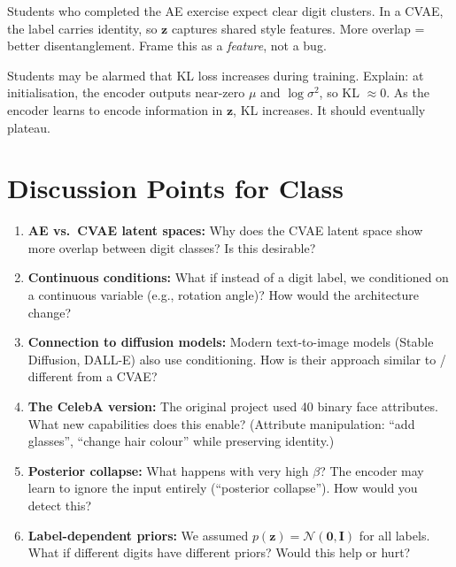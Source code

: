 \documentclass[11pt,a4paper]{article}
\begin{document}
\begin{errorbox}
Students who completed the AE exercise expect clear digit clusters. In a CVAE, the label carries identity, so $\mathbf{z}$ captures shared style features. More overlap = better disentanglement. Frame this as a \emph{feature}, not a bug.
\end{errorbox}

\begin{errorbox}
Students may be alarmed that KL loss increases during training. Explain: at initialisation, the encoder outputs near-zero $\mu$ and $\log\sigma^2$, so KL $\approx 0$. As the encoder learns to encode information in $\mathbf{z}$, KL increases. It should eventually plateau.
\end{errorbox}

\section{Discussion Points for Class}

\begin{enumerate}
    \item \textbf{AE vs.\ CVAE latent spaces:} Why does the CVAE latent space show more overlap between digit classes? Is this desirable?

    \item \textbf{Continuous conditions:} What if instead of a digit label, we conditioned on a continuous variable (e.g., rotation angle)? How would the architecture change?

    \item \textbf{Connection to diffusion models:} Modern text-to-image models (Stable Diffusion, DALL-E) also use conditioning. How is their approach similar to / different from a CVAE?

    \item \textbf{The CelebA version:} The original project used 40 binary face attributes. What new capabilities does this enable? (Attribute manipulation: ``add glasses'', ``change hair colour'' while preserving identity.)

    \item \textbf{Posterior collapse:} What happens with very high $\beta$? The encoder may learn to ignore the input entirely (``posterior collapse''). How would you detect this?

    \item \textbf{Label-dependent priors:} We assumed $p(\mathbf{z}) = \mathcal{N}(\mathbf{0}, \mathbf{I})$ for all labels. What if different digits have different priors? Would this help or hurt?
\end{enumerate}
\end{document}

